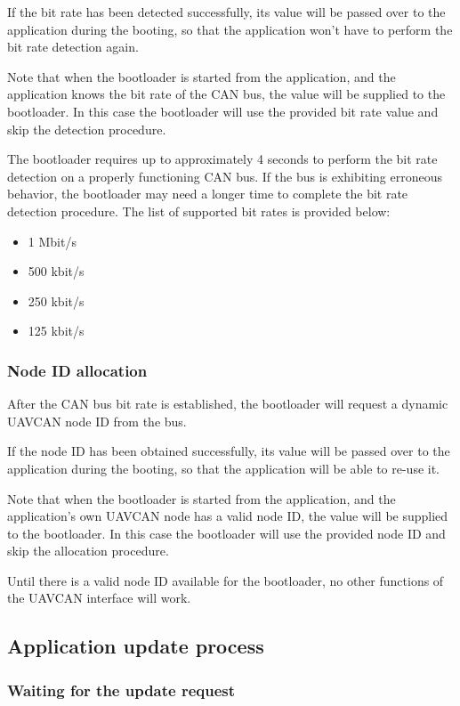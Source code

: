 \documentclass{zubaxdoc}
\begin{document}
If the bit rate has been detected successfully, its value will be passed over to the application
during the booting, so that the application won't have to perform the bit rate detection again.

Note that when the bootloader is started from the application,
and the application knows the bit rate of the CAN bus,
the value will be supplied to the bootloader.
In this case the bootloader will use the provided bit rate value and skip the detection procedure.

The bootloader requires up to approximately 4 seconds to perform the bit rate detection on a properly
functioning CAN bus.
If the bus is exhibiting erroneous behavior, the bootloader may need a longer time to complete the bit rate
detection procedure.
The list of supported bit rates is provided below:
\begin{itemize}
    \item 1 Mbit/s
    \item 500 kbit/s
    \item 250 kbit/s
    \item 125 kbit/s
\end{itemize}

\subsubsection{Node ID allocation}\label{sec:bootloader_uavcan_node_id_allocation}

After the CAN bus bit rate is established, the bootloader will request a dynamic UAVCAN node ID from the bus.

If the node ID has been obtained successfully, its value will be passed over to the application
during the booting, so that the application will be able to re-use it.

Note that when the bootloader is started from the application,
and the application's own UAVCAN node has a valid node ID,
the value will be supplied to the bootloader.
In this case the bootloader will use the provided node ID and skip the allocation procedure.

Until there is a valid node ID available for the bootloader,
no other functions of the UAVCAN interface will work.

\subsection{Application update process}

\subsubsection{Waiting for the update request}\label{sec:bootloader_uavcan_begin_update_request}
\end{document}
